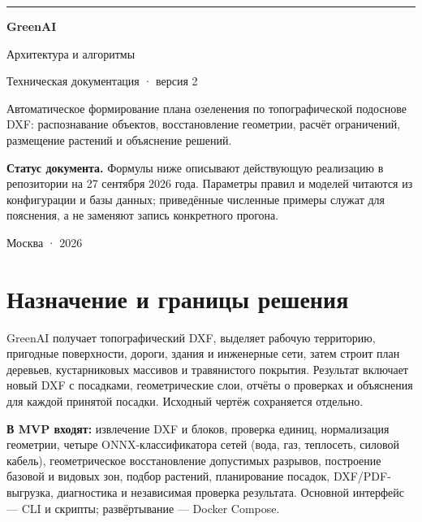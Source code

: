\documentclass[11pt,a4paper]{article}
\begin{document}
\begin{titlepage}
\vspace*{28mm}
{\color{blue}\rule{35mm}{2.5pt}}\par\vspace{13mm}
{\Huge\bfseries\color{ink}GreenAI}\par\vspace{5mm}
{\LARGE Архитектура и алгоритмы}\par\vspace{3mm}
{\Large Техническая документация · версия 2}\par
\vspace{17mm}
\begin{minipage}{0.84\linewidth}
Автоматическое формирование плана озеленения по топографической подоснове DXF: распознавание объектов, восстановление геометрии, расчёт ограничений, размещение растений и объяснение решений.
\end{minipage}
\vfill
\noindent\colorbox{pale}{\parbox{0.82\linewidth}{\textbf{Статус документа.} Формулы ниже описывают действующую реализацию в репозитории на 27 сентября 2026 года. Параметры правил и моделей читаются из конфигурации и базы данных; приведённые численные примеры служат для пояснения, а не заменяют запись конкретного прогона.}}\par
\vspace{12mm}
\noindent Москва · 2026
\end{titlepage}

\tableofcontents
\clearpage

\section{Назначение и границы решения}
GreenAI получает топографический DXF, выделяет рабочую территорию, пригодные поверхности, дороги, здания и инженерные сети, затем строит план деревьев, кустарниковых массивов и травянистого покрытия. Результат включает новый DXF с посадками, геометрические слои, отчёты о проверках и объяснения для каждой принятой посадки. Исходный чертёж сохраняется отдельно.

\textbf{В MVP входят:} извлечение DXF и блоков, проверка единиц, нормализация геометрии, четыре ONNX-классификатора сетей (вода, газ, теплосеть, силовой кабель), геометрическое восстановление допустимых разрывов, построение базовой и видовых зон, подбор растений, планирование посадок, DXF/PDF-выгрузка, диагностика и независимая проверка результата. Основной интерфейс --- CLI и скрипты; развёртывание --- Docker Compose.
\end{document}
